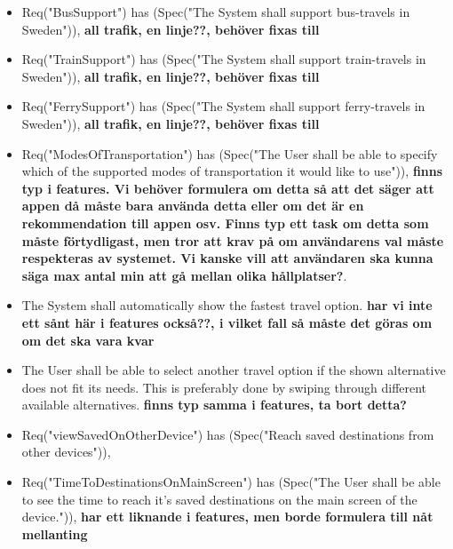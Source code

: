 \documentclass[a4paper]{article}
\begin{document}
				\begin{itemize}
					\item Req("BusSupport") has (Spec("The System shall support bus-travels in Sweden")), \textbf{all trafik, en linje??, behöver fixas till}
					\item Req("TrainSupport") has (Spec("The System shall support train-travels in Sweden")), \textbf{all trafik, en linje??, behöver fixas till}
					\item Req("FerrySupport") has (Spec("The System shall support ferry-travels in Sweden")), \textbf{all trafik, en linje??, behöver fixas till}
					\item Req("ModesOfTransportation") has (Spec("The User shall be able to specify which of the supported modes of transportation it would like to use")), \textbf{finns typ i features. Vi behöver formulera om detta så att det säger att appen då måste bara använda detta eller om det är en rekommendation till appen osv. Finns typ ett task om detta som måste förtydligast, men tror att krav på om användarens val måste respekteras av systemet. Vi kanske vill att användaren ska kunna säga max antal min att gå mellan olika hållplatser?}. 
					\item The System shall automatically show the fastest travel option. \textbf{har vi inte ett sånt här i features också??, i vilket fall så måste det göras om om det ska vara kvar}
					\item The User shall be able to select another travel option if the shown alternative does not fit its needs. This 				is preferably done by swiping through different available alternatives. \textbf{finns typ samma i features, ta bort detta?}
					\item Req("viewSavedOnOtherDevice") has (Spec("Reach saved destinations from other devices")),
					\item Req("TimeToDestinationsOnMainScreen") has (Spec("The User shall be able to see the time to reach it's saved destinations on the main screen of the device.")), \textbf{har ett liknande i features, men borde formulera till nåt mellanting}
				\end{itemize}	
					
\end{document}
